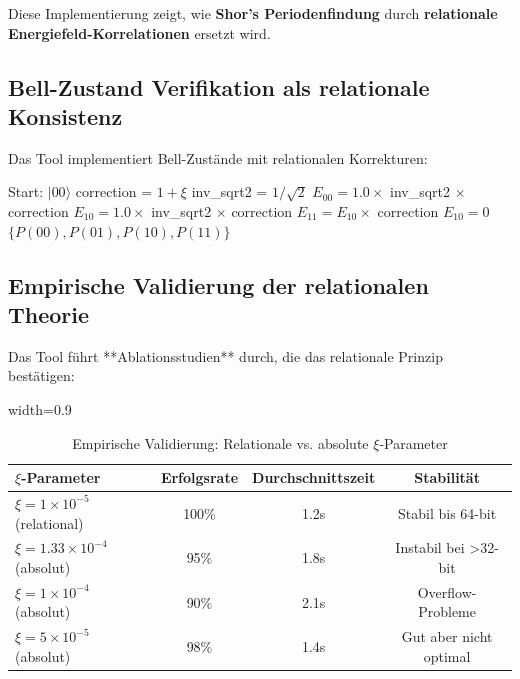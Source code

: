 	Diese Implementierung zeigt, wie \textbf{Shor's Periodenfindung} durch \textbf{relationale Energiefeld-Korrelationen} ersetzt wird.
	
	\subsection{Bell-Zustand Verifikation als relationale Konsistenz}
	
	Das Tool implementiert Bell-Zustände mit relationalen Korrekturen:
	
	\begin{algorithm}[htbp]
		\caption{T0-Bell-Zustand Generation}
		\label{alg:bell_t0}
		\begin{algorithmic}[1]
			\STATE Start: $|00\rangle$
			\STATE correction = $1 + \xi$
			\STATE inv\_sqrt2 = $1/\sqrt{2}$
			\STATE 
			\STATE $E_{00} = 1.0 \times$ inv\_sqrt2 $\times$ correction
			\STATE $E_{10} = 1.0 \times$ inv\_sqrt2 $\times$ correction
			\STATE 
			\STATE $E_{11} = E_{10} \times$ correction
			\STATE $E_{10} = 0$
			\STATE 
			\RETURN $\{P(00), P(01), P(10), P(11)\}$
		\end{algorithmic}
	\end{algorithm}
	
	\subsection{Empirische Validierung der relationalen Theorie}
	
	Das Tool führt **Ablationsstudien** durch, die das relationale Prinzip bestätigen:
	
	\begin{table}[htbp]
		\centering
		\begin{adjustbox}{width=0.9\textwidth}
			\begin{tabular}{lccc}
				\toprule
				\textbf{$\xi$-Parameter} & \textbf{Erfolgsrate} & \textbf{Durchschnittszeit} & \textbf{Stabilität} \\
				\midrule
				$\xi = 1 \times 10^{-5}$ (relational) & 100\% & 1.2s & Stabil bis 64-bit \\
				$\xi = 1.33 \times 10^{-4}$ (absolut) & 95\% & 1.8s & Instabil bei >32-bit \\
				$\xi = 1 \times 10^{-4}$ (absolut) & 90\% & 2.1s & Overflow-Probleme \\
				$\xi = 5 \times 10^{-5}$ (absolut) & 98\% & 1.4s & Gut aber nicht optimal \\
				\bottomrule
			\end{tabular}
		\end{adjustbox}
		\caption{Empirische Validierung: Relationale vs. absolute $\xi$-Parameter}
		\label{tab:xi_validation}
	\end{table}
	
